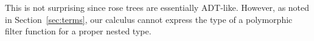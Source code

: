 \documentclass[runningheads]{llncs}
\newcommand{\F}{\mathcal{F}}
\begin{document}
\noindent
This is not surprising since rose trees are essentially
ADT-like. However, as noted in Section~\ref{sec:terms}, our calculus
cannot express the type of a polymorphic filter function for a proper
nested type.

\begin{comment}
\subsection{Short Cut Fusion for Lists}\label{sec:short-cut}
{\color{red} Remove section? Not mentioned in intro anymore.}


We can recover standard short cut fusion for lists~\cite{glp93} in our
calculus: 
\begin{theorem}
If \,$\vdash F$, $\vdash H$, and 
$G \, = \, \setsem{\beta; \emptyset \,|\, \emptyset \vdash g :
  \Nat^{\emptyset} (\Nat^{\emptyset} (\onet + F \times \beta)\,
  \beta)\, \beta}$ for some $g$, and if $c \in \setsem{\vdash F}
\,\times\, \setsem{\vdash H} \to \setsem{\vdash H}$ and $n \in
\setsem{\vdash H}$, then
\[\mathit{fold}_{1 + \setsem{\vdash F} \times \_}\, n\, c\; (G\; (\mathit{List}\,
\setsem{\vdash F})\,\mathit{nil} \,\mathit{cons}) = G \,\setsem{\vdash
  H}\, n\, c \]
\end{theorem}
\begin{proof}
Theorem~\ref{thm:abstraction} gives
that, for any $\rho : \relenv$,
\[(G \,(\pi_1 \rho), G\, (\pi_2 \rho))
 \in  \relsem{\beta; \emptyset \vdash \Nat^{\emptyset} (\Nat^{\emptyset}
  (\onet + F \times \beta)\, \beta)\, \beta} \rho\\
\cong (((\relsem{\vdash F} \rho \times
\rho\beta) \to \rho\beta) \times \rho\beta) \to \rho\beta\] 

\end{comment}
\end{document}
